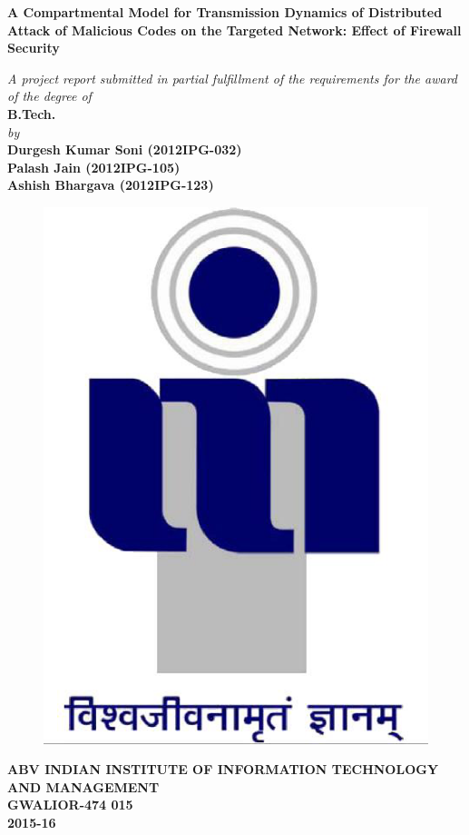 \title{}
\author{}
\thispagestyle{empty}

\begin{titlepage}
\begin{center}
{\Large \bf A Compartmental Model for Transmission Dynamics of Distributed Attack of Malicious Codes on the Targeted Network: Effect of Firewall Security} \\
\end{center}
\begin{center}
\vspace{0.4in}
{\large \it A project report submitted in partial fulfillment of the requirements for the award of the degree of} \\
\vspace{0.4in}
{\large \bf B.Tech.} \\
\vspace{0.4in}
{\large \it by\\}
\vspace{0.3in}
{\large \bf Durgesh Kumar Soni (2012IPG-032)}\\
{\large \bf Palash Jain (2012IPG-105)}\\
{\large \bf Ashish Bhargava (2012IPG-123)}\\
\end {center}
\vspace{0.4in}
\begin{figure}[ht!]
\begin{center}
\includegraphics[width=1 in]{iiitm.eps}
\end{center}
\end{figure}

\begin{center}
{ \bf ABV INDIAN INSTITUTE OF INFORMATION TECHNOLOGY AND MANAGEMENT\\
GWALIOR-474 015\\}
\vspace{0.2in}
{\Large \bf 2015-16\\}
\end{center}
\end{titlepage}
